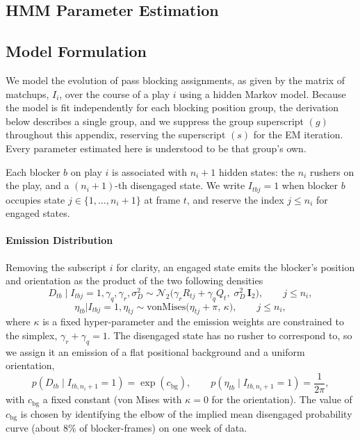 \documentclass[USenglish]{article}
\let\OldSubsection\subsection
\renewcommand{\subsection}{\FloatBarrier\OldSubsection}
\theoremstyle{dgthm}
\theoremstyle{dgdef}
\begin{document}
\begin{appendices}
\section{HMM Parameter Estimation}
\subsection{Model Formulation}
We model the evolution of pass blocking assignments, as given by the matrix of matchups, $I_i$,  over the course of a play $i$ using a hidden Markov model. Because the model is fit independently for each blocking position group, the derivation below describes a single group, and we suppress the group superscript $(g)$ throughout this appendix, reserving the superscript $(s)$ for the EM iteration. Every parameter estimated here is understood to be that group's own.

Each blocker $b$ on play $i$ is associated with $n_i + 1$ hidden states: the $n_i$ rushers on the play, and a $(n_i+1)$-th disengaged state. We write $I_{tbj} = 1$ when blocker $b$ occupies state $j \in \{1, \dots, n_i + 1\}$ at frame $t$, and reserve the index $j \le n_i$ for engaged states.

\paragraph{Emission Distribution} Removing the subscript $i$ for clarity, an engaged state emits the blocker's position and orientation as the product of the two following densities
$$ D_{tb} \mid I_{tbj} = 1, \gamma_q, \gamma_r, \sigma^2_D \sim \mathcal{N}_2\big(\gamma_r R_{tj} + \gamma_q Q_t,\; \sigma^2_D\,\mathbf{I}_2\big), \qquad j \le n_i, $$
$$ \eta_{tb} | I_{tbj} = 1, \eta_{tj} \sim \text{vonMises}\big(\eta_{tj} + \pi, \, \kappa\big), \qquad j \le n_i, $$
where $\kappa$ is a fixed hyper-parameter and the emission weights are constrained to the simplex, $\gamma_r + \gamma_q = 1$. The disengaged state has no rusher to correspond to, so we assign it an emission of a flat positional background and a uniform orientation,
$$ p(D_{tb} \mid I_{tb,n_i+1} = 1) = \exp(c_{\text{bg}}), \qquad p(\eta_{tb} \mid I_{tb,n_i+1} = 1) = \frac{1}{2\pi}, $$
with $c_{\text{bg}}$ a fixed constant (von Mises with $\kappa = 0$ for the orientation). The value of $c_{\text{bg}}$ is chosen by identifying the elbow of the implied mean disengaged probability curve (about $8\%$ of blocker-frames) on one week of data.


\end{appendices}
\end{document}
